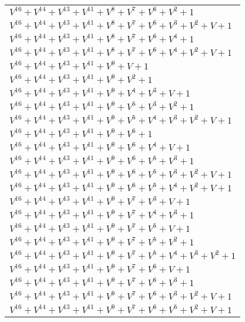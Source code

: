\documentclass[12pt]{article}
\begin{document}
\begin{adjustwidth}{-4cm}{}
\begin{center}
\begin{longtable}{|l|}
$V^{16}  +V^{14}  +V^{13}  +V^{11}  +V^{8}  +V^{7}  +V^{6}  +V^{2}  + 1$ \\
$V^{16}  +V^{14}  +V^{13}  +V^{11}  +V^{8}  +V^{7}  +V^{6}  +V^{3}  +V^{2}  + V + 1$ \\
$V^{16}  +V^{14}  +V^{13}  +V^{11}  +V^{8}  +V^{7}  +V^{6}  +V^{4}  + 1$ \\
$V^{16}  +V^{14}  +V^{13}  +V^{11}  +V^{8}  +V^{7}  +V^{6}  +V^{4}  +V^{2}  + V + 1$ \\
$V^{16}  +V^{14}  +V^{13}  +V^{11}  +V^{9}  + V + 1$ \\
$V^{16}  +V^{14}  +V^{13}  +V^{11}  +V^{9}  +V^{2}  + 1$ \\
$V^{16}  +V^{14}  +V^{13}  +V^{11}  +V^{9}  +V^{4}  +V^{3}  + V + 1$ \\
$V^{16}  +V^{14}  +V^{13}  +V^{11}  +V^{9}  +V^{5}  +V^{3}  +V^{2}  + 1$ \\
$V^{16}  +V^{14}  +V^{13}  +V^{11}  +V^{9}  +V^{5}  +V^{4}  +V^{3}  +V^{2}  + V + 1$ \\
$V^{16}  +V^{14}  +V^{13}  +V^{11}  +V^{9}  +V^{6}  + 1$ \\
$V^{16}  +V^{14}  +V^{13}  +V^{11}  +V^{9}  +V^{6}  +V^{4}  + V + 1$ \\
$V^{16}  +V^{14}  +V^{13}  +V^{11}  +V^{9}  +V^{6}  +V^{5}  +V^{3}  + 1$ \\
$V^{16}  +V^{14}  +V^{13}  +V^{11}  +V^{9}  +V^{6}  +V^{5}  +V^{3}  +V^{2}  + V + 1$ \\
$V^{16}  +V^{14}  +V^{13}  +V^{11}  +V^{9}  +V^{6}  +V^{5}  +V^{4}  +V^{2}  + V + 1$ \\
$V^{16}  +V^{14}  +V^{13}  +V^{11}  +V^{9}  +V^{7}  +V^{3}  + V + 1$ \\
$V^{16}  +V^{14}  +V^{13}  +V^{11}  +V^{9}  +V^{7}  +V^{4}  +V^{3}  + 1$ \\
$V^{16}  +V^{14}  +V^{13}  +V^{11}  +V^{9}  +V^{7}  +V^{5}  + V + 1$ \\
$V^{16}  +V^{14}  +V^{13}  +V^{11}  +V^{9}  +V^{7}  +V^{5}  +V^{2}  + 1$ \\
$V^{16}  +V^{14}  +V^{13}  +V^{11}  +V^{9}  +V^{7}  +V^{5}  +V^{4}  +V^{3}  +V^{2}  + 1$ \\
$V^{16}  +V^{14}  +V^{13}  +V^{11}  +V^{9}  +V^{7}  +V^{6}  + V + 1$ \\
$V^{16}  +V^{14}  +V^{13}  +V^{11}  +V^{9}  +V^{7}  +V^{6}  +V^{3}  + 1$ \\
$V^{16}  +V^{14}  +V^{13}  +V^{11}  +V^{9}  +V^{7}  +V^{6}  +V^{3}  +V^{2}  + V + 1$ \\
$V^{16}  +V^{14}  +V^{13}  +V^{11}  +V^{9}  +V^{7}  +V^{6}  +V^{5}  +V^{2}  + V + 1$ \\

\end{longtable}
\end{center}
\end{adjustwidth}
\end{document}
